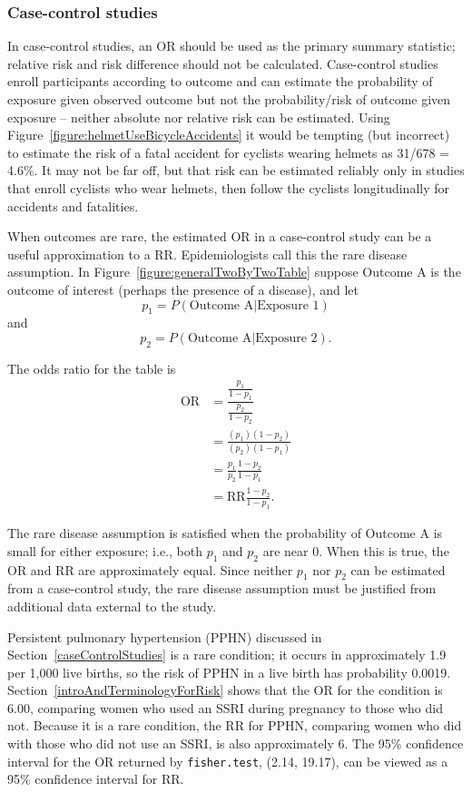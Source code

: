 \subsubsection{Case-control studies}

In case-control studies, an OR should be used as the primary summary statistic; relative risk and risk difference should not be calculated. Case-control studies enroll participants according to outcome and can estimate the probability of exposure given observed outcome but not the probability/risk of outcome given exposure -- neither absolute nor relative risk can be estimated. Using Figure~\ref{figure:helmetUseBicycleAccidents}  it would be tempting (but incorrect) to estimate the risk of a fatal accident for cyclists wearing helmets as 31/678 = 4.6\%.  It may not be far off, but that risk can be estimated reliably only in studies that enroll cyclists who wear helmets, then follow the cyclists longitudinally for accidents and fatalities.

When outcomes are rare, the estimated OR in a case-control study can be a useful approximation to a RR.  Epidemiologists call this the rare disease assumption.  In Figure~\ref{figure:generalTwoByTwoTable} suppose Outcome A is the outcome of interest (perhaps the presence of a disease), and let 
\[
  p_1 = P(\text{Outcome A} | \text{Exposure 1})
\]
and
\[
  p_2 = P(\text{Outcome A} | \text{Exposure 2}). 
\]

The odds ratio for the table is 
\begin{align*}
  \text{OR} &= \dfrac{\frac{p_1}{1 - p_1}}{\frac{p_2}{1 - p_2}} \\
            &= \frac{(p_1)(1 - p_2)}{(p_2)(1 - p_1)} \\
            &= \frac{p_1}{p_2} \frac{1 - p_2}{1 - p_1} \\
            &= \text{RR} \frac{1 - p_2}{1 - p_1}. 
\end{align*}

The rare disease assumption is satisfied when the probability of Outcome A is small for either exposure; i.e., both $p_1$ and $p_2$ are near 0. When this is true, the OR and RR are approximately equal. Since neither $p_1$ nor $p_2$ can be estimated from a case-control study, the rare disease assumption must be justified from additional data external to the study.

Persistent pulmonary hypertension (PPHN) discussed in Section~\ref{caseControlStudies} is a rare condition; it occurs in approximately 1.9 per 1,000 live births, so the risk of PPHN in a live birth has probability 0.0019. Section~\ref{introAndTerminologyForRisk} shows that the OR for the condition is 6.00, comparing women who used an SSRI during pregnancy to those who did not.  Because it is a rare condition, the RR for PPHN, comparing women who did with those who did not use an SSRI, is also approximately 6.  The 95\% confidence interval for the OR returned by \texttt{fisher.test}, (2.14, 19.17), can be viewed as a 95\% confidence interval for RR.

